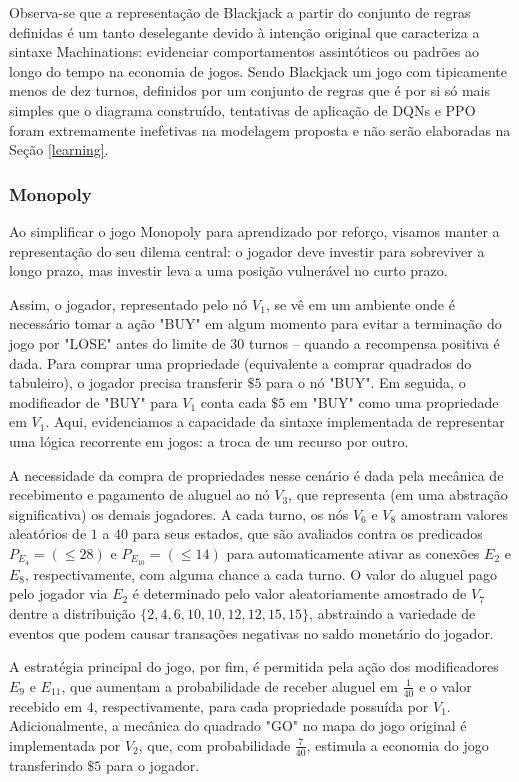 \documentclass[conference]{IEEEtran}
\begin{document}
Observa-se que a representação de Blackjack a partir do conjunto de regras definidas é um tanto deselegante devido à intenção original que caracteriza a sintaxe Machinations: evidenciar comportamentos assintóticos ou padrões ao longo do tempo na economia de jogos. Sendo Blackjack um jogo com tipicamente menos de dez turnos, definidos por um conjunto de regras que é por si só mais simples que o diagrama construído, tentativas de aplicação de DQNs\cite{dqn} e PPO foram extremamente inefetivas na modelagem proposta e não serão elaboradas na Seção \ref{learning}.


\subsubsection{Monopoly}
\label{modeling:monopoly}
Ao simplificar o jogo Monopoly para aprendizado por reforço, visamos manter a representação do seu dilema central: o jogador deve investir para sobreviver a longo prazo, mas investir leva a uma posição vulnerável no curto prazo.

Assim, o jogador, representado pelo nó $V_1$, se vê em um ambiente onde é necessário tomar a ação "BUY" em algum momento para evitar a terminação do jogo por "LOSE" antes do limite de 30 turnos -- quando a recompensa positiva é dada. Para comprar uma propriedade (equivalente a comprar quadrados do tabuleiro), o jogador precisa transferir $\$5$ para o nó "BUY". Em seguida, o modificador de "BUY" para $V_1$ conta cada $\$5$ em "BUY" como uma propriedade em $V_1$. Aqui, evidenciamos a capacidade da sintaxe implementada de representar uma lógica recorrente em jogos: a troca de um recurso por outro.

A necessidade da compra de propriedades nesse cenário é dada pela mecânica de recebimento e pagamento de aluguel ao nó $V_3$, que representa (em uma abstração significativa) os demais jogadores. A cada turno, os nós $V_6$ e $V_8$ amostram valores aleatórios de $1$ a $40$ para seus estados, que são avaliados contra os predicados $P_{E_4} = (\leq 28)$ e $P_{E_{10}} = (\leq 14)$ para automaticamente ativar as conexões $E_2$ e $E_8$, respectivamente, com alguma chance a cada turno. O valor do aluguel pago pelo jogador via $E_2$ é determinado pelo valor aleatoriamente amostrado de $V_7$ dentre a distribuição $\{2, 4, 6, 10, 10, 12, 12, 15, 15\}$, abstraindo a variedade de eventos que podem causar transações negativas no saldo monetário do jogador.

A estratégia principal do jogo, por fim, é permitida pela ação dos modificadores $E_9$ e $E_{11}$, que aumentam a probabilidade de receber aluguel em $\frac{1}{40}$ e o valor recebido em $4$, respectivamente, para cada propriedade possuída por $V_1$. Adicionalmente, a mecânica do quadrado "GO" no mapa do jogo original é implementada por $V_2$, que, com probabilidade $\frac{7}{40}$, estimula a economia do jogo transferindo $\$5$ para o jogador.
\end{document}
